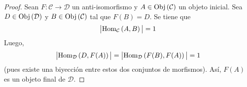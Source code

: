 \documentclass[12pt]{report}
\theoremstyle{largebreak}
\newcommand\abs[1]{\ensuremath{\big|#1\big|}}
\newcommand\cf[3]{\ensuremath{#1:#2\rightarrow#3}}
\newcommand{\Obj}[1]{\ensuremath{\textup{Obj}\left(#1\right)}}
\newcommand{\Hom}[3]{\ensuremath{\textup{Hom}_{#1}\left(#2,#3\right)}}
\begin{document}
    \begin{proof}
        Sean $\cf{F}{\mathcal{C}}{\mathcal{D}}$ un anti-isomorfismo y $A\in\Obj{\mathcal{C}}$ un objeto inicial. Sea $D\in\Obj{\mathcal{D}}$ y $B\in\Obj{\mathcal{C}}$ tal que $F(B)=D$. Se tiene que
        \begin{equation*}
            \abs{\Hom{\mathcal{C}}{A}{B}}=1
        \end{equation*}
        Luego,
        \begin{equation*}
            \abs{\Hom{\mathcal{D}}{D}{F(A)}}=\abs{\Hom{\mathcal{D}}{F(B)}{F(A)}}=1
        \end{equation*}
        (pues existe una biyección entre estos dos conjuntos de morfismos). Así, $F(A)$ es un objeto final de $\mathcal{D}$.
    \end{proof}
\end{document}
